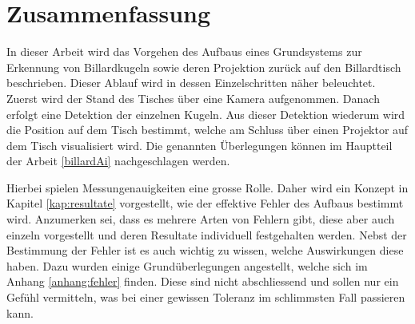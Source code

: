 \chapter{Zusammenfassung}
In dieser Arbeit wird das Vorgehen des Aufbaus eines Grundsystems zur Erkennung von Billardkugeln sowie deren
Projektion zurück auf den Billardtisch beschrieben. Dieser Ablauf wird in dessen Einzelschritten näher beleuchtet.
Zuerst wird der Stand des Tisches über eine Kamera aufgenommen. Danach erfolgt eine Detektion der einzelnen Kugeln.
Aus dieser Detektion wiederum wird die Position auf dem Tisch bestimmt, welche am Schluss über einen Projektor
auf dem Tisch visualisiert wird. Die genannten Überlegungen können im Hauptteil der Arbeit \ref{billardAi} nachgeschlagen werden.

Hierbei spielen Messungenauigkeiten eine grosse Rolle. Daher wird ein Konzept in Kapitel \ref{kap:resultate} vorgestellt, wie der
effektive Fehler des Aufbaus bestimmt wird. Anzumerken sei, dass es mehrere Arten von Fehlern gibt, diese aber auch einzeln
vorgestellt und deren Resultate individuell festgehalten werden. Nebst der Bestimmung der Fehler ist es auch wichtig zu wissen,
welche Auswirkungen diese haben. Dazu wurden einige Grundüberlegungen angestellt, welche sich im Anhang \ref{anhang:fehler}
finden. Diese sind nicht abschliessend und sollen nur ein Gefühl vermitteln, was bei einer gewissen Toleranz im schlimmsten
Fall passieren kann.